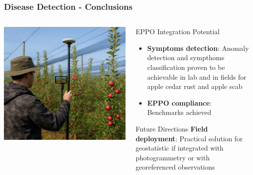 \documentclass[aspectratio=43]{beamer}
\begin{document}
\begin{frame}
    \frametitle{\small Disease Detection - Conclusions}
    
    \begin{columns}
        \begin{column}{0.5\textwidth}
            \includegraphics[width=\linewidth]{Imgs/Anomaly_conclusion.png}
        \end{column}
        
        \begin{column}{0.5\textwidth}
            \begin{alertblock}{EPPO Integration Potential}
                \begin{itemize}
                    \item \textbf{Symptoms detection}: \small Anomaly detection and sympthoms classification proven to be achievable in lab and in fields for apple cedar rust and apple scab
                    \item \textbf{EPPO compliance}: \small Benchmarks achieved
                \end{itemize}
            \end{alertblock}
            
            \begin{exampleblock}{Future Directions}
                \textbf{Field deployment}: Practical solution for geostatistic if integrated with photogrammetry or with georeferenced observations
            \end{exampleblock}
        \end{column}
    \end{columns}
\end{frame}
\end{document}

